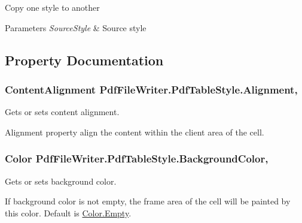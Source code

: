 Copy one style to another 


\begin{DoxyParams}{Parameters}
{\em Source\+Style} & Source style\\
\hline
\end{DoxyParams}


\subsection{Property Documentation}
\subsubsection[{\texorpdfstring{Alignment}{Alignment}}]{\setlength{\rightskip}{0pt plus 5cm}Content\+Alignment Pdf\+File\+Writer.\+Pdf\+Table\+Style.\+Alignment\hspace{0.3cm}{\ttfamily [get]}, {\ttfamily [set]}}\hypertarget{class_pdf_file_writer_1_1_pdf_table_style_a07f8249b8fb4f198fc637f8125b4fe4b}{}\label{class_pdf_file_writer_1_1_pdf_table_style_a07f8249b8fb4f198fc637f8125b4fe4b}


Gets or sets content alignment. 

Alignment property align the content within the client area of the cell. 
\subsubsection[{\texorpdfstring{Background\+Color}{BackgroundColor}}]{\setlength{\rightskip}{0pt plus 5cm}Color Pdf\+File\+Writer.\+Pdf\+Table\+Style.\+Background\+Color\hspace{0.3cm}{\ttfamily [get]}, {\ttfamily [set]}}\hypertarget{class_pdf_file_writer_1_1_pdf_table_style_af43917b38ac7437311cd87edb6c874a2}{}\label{class_pdf_file_writer_1_1_pdf_table_style_af43917b38ac7437311cd87edb6c874a2}


Gets or sets background color. 

If background color is not empty, the frame area of the cell will be painted by this color. Default is \hyperlink{namespace_pdf_file_writer_a45e52c090a4d8e1333577773ec0bac4aace2c8aed9c2fa0cfbed56cbda4d8bf07}{Color.\+Empty}. 
